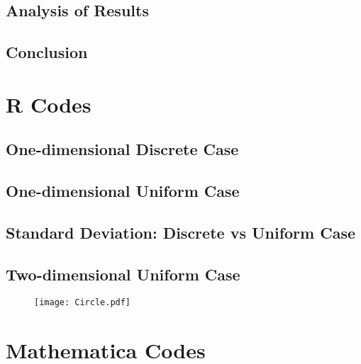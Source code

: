 \documentclass[11pt, twoside, reqno]{book}
\begin{document}
\section{Analysis of Results}
\label{secC5}

\section{Conclusion}
\label{secC6}

\begin{appendices}
\chapter{R Codes}
\label{rcodes}

\section{One-dimensional Discrete Case}
\label{A.1}
\newpage

\begin{figure}[H]
\end{figure}

\section{One-dimensional Uniform Case}
\label{A.2}

\begin{figure}[H]
\end{figure}

\section{Standard Deviation: Discrete vs Uniform Case}
\label{A.3}

\begin{figure}[H]
\end{figure}

\section{Two-dimensional Uniform Case}
\label{A.4}
\begin{figure}[H]
\centering
\texttt{[image: Circle.pdf]}
\end{figure}

\chapter{Mathematica Codes}
\label{label}


\end{appendices}
\end{document}
